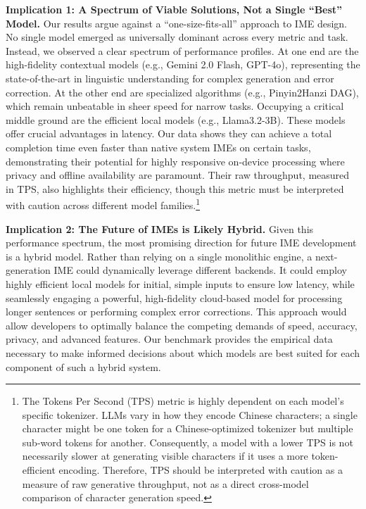 \documentclass[10pt, a4paper]{article}
\begin{document}
\textbf{Implication 1: A Spectrum of Viable Solutions, Not a Single ``Best'' Model.}
Our results argue against a ``one-size-fits-all'' approach to IME design. No single model emerged as universally dominant across every metric and task. Instead, we observed a clear spectrum of performance profiles. At one end are the {high-fidelity contextual models} (e.g., Gemini 2.0 Flash, GPT-4o), representing the state-of-the-art in linguistic understanding for complex generation and error correction. At the other end are {specialized algorithms} (e.g., Pinyin2Hanzi DAG), which remain unbeatable in sheer speed for narrow tasks.
Occupying a critical middle ground are the {efficient local models} (e.g., Llama3.2-3B). These models offer crucial advantages in latency. Our data shows they can achieve a total completion time even faster than native system IMEs on certain tasks, demonstrating their potential for highly responsive on-device processing where privacy and offline availability are paramount. Their raw throughput, measured in TPS, also highlights their efficiency, though this metric must be interpreted with caution across different model families.\footnote{The Tokens Per Second (TPS) metric is highly dependent on each model's specific tokenizer. LLMs vary in how they encode Chinese characters; a single character might be one token for a Chinese-optimized tokenizer but multiple sub-word tokens for another. Consequently, a model with a lower TPS is not necessarily slower at generating visible characters if it uses a more token-efficient encoding. Therefore, TPS should be interpreted with caution as a measure of raw generative throughput, not as a direct cross-model comparison of character generation speed.}

\textbf{Implication 2: The Future of IMEs is Likely Hybrid.}
Given this performance spectrum, the most promising direction for future IME development is a hybrid model. Rather than relying on a single monolithic engine, a next-generation IME could dynamically leverage different backends. It could employ highly efficient local models for initial, simple inputs to ensure low latency, while seamlessly engaging a powerful, high-fidelity cloud-based model for processing longer sentences or performing complex error corrections. This approach would allow developers to optimally balance the competing demands of speed, accuracy, privacy, and advanced features. Our benchmark provides the empirical data necessary to make informed decisions about which models are best suited for each component of such a hybrid system.
\end{document}
